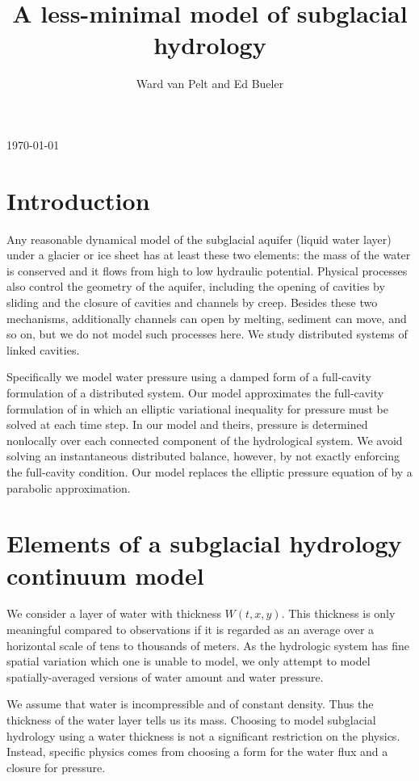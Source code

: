 \documentclass[11pt,final]{amsart}%
\title[]{A less-minimal model of subglacial hydrology}
\author[]{Ward van Pelt and Ed Bueler}
\begin{document}
\scriptsize \hfill \today \normalsize
\vspace{0.5in}

\maketitle
\thispagestyle{empty}

\section{Introduction}

Any reasonable dynamical model of the subglacial aquifer (liquid water layer) under a glacier or ice sheet has at least these two elements: the mass of the water is conserved and it flows from high to low hydraulic potential.  Physical processes also control the geometry of the aquifer, including the opening of cavities by sliding and the closure of cavities and channels by creep.  Besides these two mechanisms, additionally channels can open by melting, sediment can move, and so on, but we do not model such processes here.  We study distributed systems of linked cavities.

Specifically we model water pressure using a damped form of a full-cavity formulation of a distributed system.  Our model approximates the full-cavity formulation of \cite{Schoofetal2012} in which an elliptic variational inequality for pressure must be solved at each time step.  In our model and theirs, pressure is determined nonlocally over each connected component of the hydrological system.  We avoid solving an instantaneous distributed balance, however, by not exactly enforcing the full-cavity condition.  Our model replaces the elliptic pressure equation of \cite{Schoofetal2012} by a parabolic approximation.


\section{Elements of a subglacial hydrology continuum model}

We consider a layer of water with thickness $W(t,x,y)$.  This thickness is only meaningful compared to observations if it is regarded as an average over a horizontal scale of tens to thousands of meters.  As the hydrologic system has fine spatial variation which one is unable to model, we only attempt to model spatially-averaged versions of water amount and water pressure.

We assume that water is incompressible and of constant density.  Thus the thickness of the water layer tells us its mass.  Choosing to model subglacial hydrology using a water thickness is not a significant restriction on the physics.  Instead, specific physics comes from choosing a form for the water flux and a closure for pressure.
\end{document}
